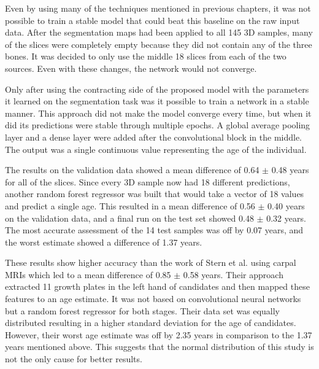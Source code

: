 Even by using many of the techniques mentioned in previous chapters, it was not possible to train a stable model that could beat this baseline on the raw input data. After the segmentation maps had been applied to all 145 3D samples, many of the slices were completely empty because they did not contain any of the three bones. It was decided to only use the middle 18 slices from each of the two sources. Even with these changes, the network would not converge.

Only after using the contracting side of the proposed model with the parameters it learned on the segmentation task was it possible to train a network in a stable manner. This approach did not make the model converge every time, but when it did its predictions were stable through multiple epochs. A global average pooling layer and a dense layer were added after the convolutional block in the middle. The output was a single continuous value representing the age of the individual.

The results on the validation data showed a mean difference of 0.64 $\pm$ 0.48 years for all of the slices. Since every 3D sample now had 18 different predictions, another random forest regressor was built that would take a vector of 18 values and predict a single age. This resulted in a mean difference of 0.56 $\pm$ 0.40 years on the validation data, and a final run on the test set showed 0.48 $\pm$ 0.32 years. The most accurate assessment of the 14 test samples was off by 0.07 years, and the worst estimate showed a difference of 1.37 years.

These results show higher accuracy than the work of Stern et al. \cite{Stern2014} using carpal MRIs which led to a mean difference of 0.85 $\pm$ 0.58 years. Their approach extracted 11 growth plates in the left hand of candidates and then mapped these features to an age estimate. It was not based on convolutional neural networks but a random forest regressor for both stages. Their data set was equally distributed resulting in a higher standard deviation for the age of candidates. However, their worst age estimate was off by 2.35 years in comparison to the 1.37 years mentioned above. This suggests that the normal distribution of this study is not the only cause for better results.

\newpage
